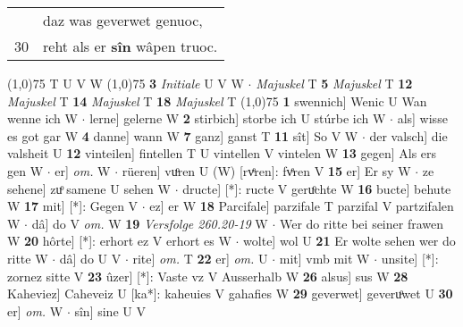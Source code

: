 \documentclass[8pt,a4paper,notitlepage]{article}
\begin{document}
\begin{table}[ht]
\begin{minipage}[t]{0.5\linewidth}
\begin{tabular}{rl}
 & daz was geverwet genuoc,\\ 
30 & reht als er \textbf{sîn} wâpen truoc.\\ 
\end{tabular}
\scriptsize
\line(1,0){75} \newline
T U V W \newline
\line(1,0){75} \newline
\textbf{3} \textit{Initiale} U V W   $\cdot$ \textit{Majuskel} T  \textbf{5} \textit{Majuskel} T  \textbf{12} \textit{Majuskel} T  \textbf{14} \textit{Majuskel} T  \textbf{18} \textit{Majuskel} T  \newline
\line(1,0){75} \newline
\textbf{1} swennich] Wenic U Wan wenne ich W  $\cdot$ lerne] gelerne W \textbf{2} stirbich] storbe ich U stúrbe ich W  $\cdot$ als] wisse es got gar W \textbf{4} danne] wann W \textbf{7} ganz] ganst T \textbf{11} sît] So V W  $\cdot$ der valsch] die valsheit U \textbf{12} vinteilen] fintellen T U vintellen V vintelen W \textbf{13} gegen] Als ers gen W  $\cdot$ er] \textit{om.} W  $\cdot$ rüeren] vuͦren U (W) [rvͤren]: fvͤren  V \textbf{15} er] Er sy W  $\cdot$ ze sehene] zuͦ samene U sehen W  $\cdot$ dructe] [*]: ructe V geruͦchte W \textbf{16} bucte] behute W \textbf{17} mit] [*]: Gegen V  $\cdot$ ez] er W \textbf{18} Parcifale] parzifale T parzifal V partzifalen W  $\cdot$ dâ] do V \textit{om.} W \textbf{19} \textit{Versfolge 260.20-19} W   $\cdot$ Wer do ritte bei seiner frawen W \textbf{20} hôrte] [*]: erhort ez V erhort es W  $\cdot$ wolte] wol U \textbf{21} Er wolte sehen wer do ritte W  $\cdot$ dâ] do U V  $\cdot$ rite] \textit{om.} T \textbf{22} er] \textit{om.} U  $\cdot$ mit] vmb mit W  $\cdot$ unsite] [*]: zornez sitte V \textbf{23} ûzer] [*]: Vaste vz V Ausserhalb W \textbf{26} alsus] sus W \textbf{28} Kaheviez] Caheveiz U [ka*]: kaheuies V gahafies W \textbf{29} geverwet] geveruͦwet U \textbf{30} er] \textit{om.} W  $\cdot$ sîn] sine U V \newline
\end{minipage}
\end{table}
\end{document}
